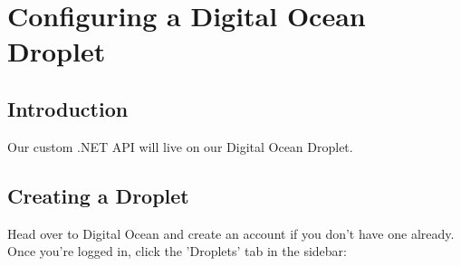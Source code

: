 \documentclass[a4paper,
                             oneside,
                             BCOR1.0cm,
                             DIV11,
                             parskip=full,
                             11pt]{scrbook}
\begin{document}
\chapter{Configuring a Digital Ocean Droplet}\label{cap:primer}

\section{Introduction}

Our custom .NET API will live on our Digital Ocean Droplet.

\section{Creating a Droplet}

Head over to Digital Ocean and create an account if you don't have one already. Once you're logged in, click the 'Droplets' tab in the sidebar:
\end{document}

